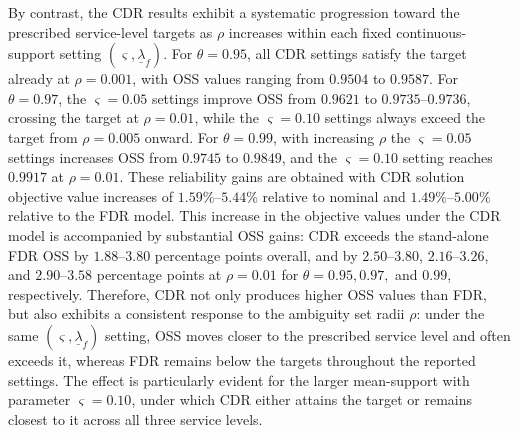 \documentclass[opre,sglanonrev]{informs4}
\begin{document}
{By contrast, the CDR results exhibit a systematic progression toward the prescribed service-level targets as \(\rho\) increases within each fixed continuous-support setting \((\varsigma,\underline{\lambda}_f)\). For \(\theta=0.95\), all CDR settings satisfy the target already at \(\rho=0.001\), with OSS values ranging from \(0.9504\) to \(0.9587\). For \(\theta=0.97\), the \(\varsigma=0.05\) settings improve OSS from \(0.9621\) to \(0.9735\)--\(0.9736\), crossing the target at \(\rho=0.01\), while the \(\varsigma=0.10\) settings always exceed the target from \(\rho=0.005\) onward. For \(\theta=0.99\), with increasing $\rho$ the \(\varsigma=0.05\) settings increases OSS from \(0.9745\) to \(0.9849\), and the \(\varsigma=0.10\) setting reaches \(0.9917\) at \(\rho=0.01\). These reliability gains are obtained with CDR solution objective value increases of \(1.59\%\)--\(5.44\%\) relative to nominal and \(1.49\%\)--\(5.00\%\) relative to the FDR model. This increase in the objective values under the CDR model is accompanied by substantial OSS gains:
CDR exceeds the stand-alone FDR OSS by \(1.88\)--\(3.80\) percentage points
overall, and by \(2.50\)--\(3.80\), \(2.16\)--\(3.26\), and \(2.90\)--\(3.58\)
percentage points at \(\rho=0.01\) for \(\theta=0.95,0.97,\) and \(0.99\),
respectively. Therefore, CDR not only produces higher OSS values than FDR, but
also exhibits a consistent response to the ambiguity set radii \(\rho\): under the same
\((\varsigma,\underline{\lambda}_f)\) setting, OSS moves closer to the prescribed service level and often exceeds it, whereas FDR remains below the targets throughout the reported settings. The effect is particularly evident for the larger mean-support with parameter \(\varsigma=0.10\), under which CDR either attains the target or remains closest to it across all three service levels. 




}
\end{document}
